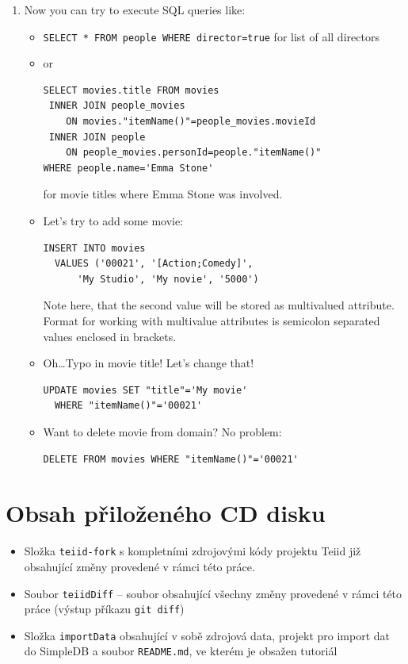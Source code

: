 \documentclass[oneside,12pt]{fithesis2}
\begin{document}
\begin{enumerate}
\begin{enumerate}
\item Now you can try to execute SQL queries like:
\begin{itemize}
 \item \texttt{SELECT * FROM people WHERE director=true} for list of all directors
 \item or
 \begin{Verbatim}[fontsize=\small]
SELECT movies.title FROM movies 
 INNER JOIN people_movies 
    ON movies."itemName()"=people_movies.movieId 
 INNER JOIN people 
    ON people_movies.personId=people."itemName()" 
WHERE people.name='Emma Stone'
 \end{Verbatim}
for movie titles where Emma Stone was involved.
\item Let's try to add some movie:
 \begin{Verbatim}[fontsize=\small]
INSERT INTO movies 
  VALUES ('00021', '[Action;Comedy]', 
	  'My Studio', 'My novie', '5000')
 \end{Verbatim}
 Note here, that the second value will be stored as multivalued attribute. Format for working with multivalue attributes is semicolon separated values enclosed in brackets.
 \item Oh\dots Typo in movie title! Let's change that!
  \begin{Verbatim}[fontsize=\small]
UPDATE movies SET "title"='My movie' 
  WHERE "itemName()"='00021'
 \end{Verbatim}
 \item Want to delete movie from domain? No problem:
   \begin{Verbatim}[fontsize=\small]
DELETE FROM movies WHERE "itemName()"='00021'
 \end{Verbatim}
\end{itemize}


\end{enumerate}


\end{enumerate}

\chapter{Obsah přiloženého CD disku}
\begin{itemize}
 \item Složka \texttt{teiid-fork} s kompletními zdrojovými kódy projektu Teiid již obsahující změny provedené v rámci této práce.
 \item Soubor \texttt{teiidDiff} -- soubor obsahující všechny změny provedené v rámci této práce (výstup příkazu \texttt{git diff})
 \item Složka \texttt{importData} obsahující v sobě zdrojová data, projekt pro import dat do SimpleDB a soubor \texttt{README.md}, ve kterém je obsažen tutoriál
\end{itemize}
\end{document}
